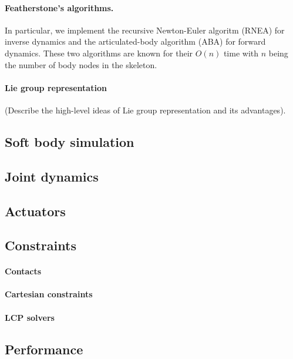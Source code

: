 \paragraph{Featherstone's algorithms.} In particular, we implement the
recursive Newton-Euler algoritm (RNEA) for inverse dynamics and the
articulated-body algorithm (ABA) for forward dynamics. These two
algorithms are known for their $O(n)$ time with $n$ being the number of
body nodes in the skeleton. 

\paragraph{Lie group representation}
 (Describe the high-level ideas of Lie group representation and its advantages).

\subsection{Soft body simulation}
\subsection{Joint dynamics}

\subsection{Actuators}

\subsection{Constraints}
\paragraph{Contacts}
\paragraph{Cartesian constraints}
\paragraph{LCP solvers}

\subsection{Performance}
